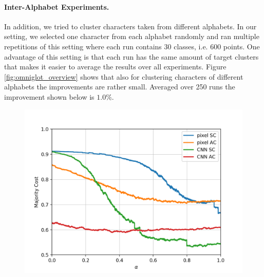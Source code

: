 \paragraph{Inter-Alphabet Experiments.} In addition, we tried to cluster characters taken from different alphabets. In our setting, we selected one character from each alphabet randomly and ran multiple repetitions of this setting where each run contains 30 classes, i.e. 600 points. One advantage of this setting is that each run has the same amount of target clusters that makes it easier to average the results over all experiments. Figure \ref{fig:omniglot_overview} shows that also for clustering characters of different alphabets the improvements are rather small. Averaged over 250 runs the improvement shown below is $1.0\%$.

\begin{figure}[H]
  \centering
  \begin{minipage}{.45\textwidth}
  \centering
  {\includegraphics[width=\linewidth]{plots/omniglot_all}}
\end{minipage}\quad
\begin{minipage}{.45\textwidth}
  \centering

\end{minipage}
\end{figure}
